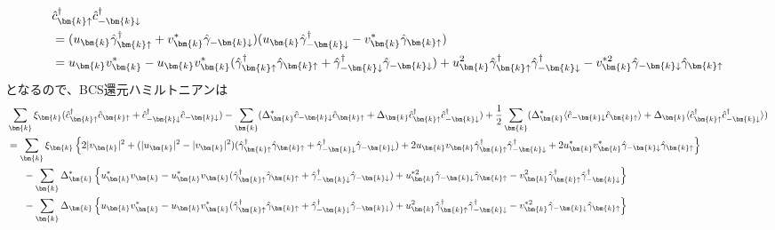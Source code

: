 \documentclass[dvipdfmx, 11pt, a4paper]{jsarticle}
\numberwithin{equation}{section}
\theoremstyle{definition}
\begin{document}
\begin{derivationBox}
\begin{align}
            &\hat{c}_{\bm{k}\uparrow}^\dagger \hat{c}_{-\bm{k}\downarrow}^\dagger \notag \\
            &= (u_{\bm{k}} \hat{\gamma}_{\bm{k}\uparrow}^\dagger + v_{\bm{k}}^* \hat{\gamma}_{-\bm{k}\downarrow})(u_{\bm{k}}\hat{\gamma}_{-\bm{k}\downarrow}^\dagger - v_{\bm{k}}^* \hat{\gamma}_{\bm{k}\uparrow}) \notag \\
            &= u_{\bm{k}}v_{\bm{k}}^* - u_{\bm{k}}v_{\bm{k}}^*(\hat{\gamma}_{\bm{k}\uparrow}^\dagger\hat{\gamma}_{\bm{k}\uparrow} + \hat{\gamma}_{-\bm{k}\downarrow}^\dagger \hat{\gamma}_{-\bm{k}\downarrow} ) + u_{\bm{k}}^2\hat{\gamma}_{\bm{k}\uparrow}^\dagger \hat{\gamma}_{-\bm{k}\downarrow}^\dagger - v_{\bm{k}}^{*2} \hat{\gamma}_{-\bm{k}\downarrow}\hat{\gamma}_{\bm{k}\uparrow}
        \end{align}
        となるので、BCS還元ハミルトニアンは
        \begin{align}
            &\sum_{\bm{k}} \xi_{\bm{k}} (\hat{c}_{\bm{k}\uparrow}^\dagger \hat{c}_{\bm{k}\uparrow} + \hat{c}_{-\bm{k}\downarrow}^\dagger \hat{c}_{-\bm{k}\downarrow}) - \sum_{\bm{k}} (\Delta_{\bm{k}}^* \hat{c}_{-\bm{k}\downarrow}\hat{c}_{\bm{k}\uparrow} + \Delta_{\bm{k}}\hat{c}_{\bm{k}\uparrow}^\dagger \hat{c}_{-\bm{k}\downarrow}^\dagger) + \frac{1}{2}\sum_{\bm{k}}(\Delta_{\bm{k}}^* \langle \hat{c}_{-\bm{k}\downarrow}\hat{c}_{\bm{k}\uparrow}  \rangle + \Delta_{\bm{k}} \langle \hat{c}_{\bm{k}\uparrow}^\dagger \hat{c}_{-\bm{k}\downarrow}^\dagger \rangle ) \notag \\
            &= \sum_{\bm{k}}\xi_{\bm{k}} \left\{ 2|v_{\bm{k}}|^2 + (|u_{\bm{k}}|^2 - |v_{\bm{k}}|^2)(\hat{\gamma}_{\bm{k}\uparrow}^\dagger \hat{\gamma}_{\bm{k}\uparrow} + \hat{\gamma}_{-\bm{k}\downarrow}^\dagger\hat{\gamma}_{-\bm{k}\downarrow}) +2u_{\bm{k}}v_{\bm{k}} \hat{\gamma}_{\bm{k}\uparrow}^\dagger  \hat{\gamma}_{-\bm{k}\downarrow}^\dagger + 2u_{\bm{k}}^* v_{\bm{k}}^* \hat{\gamma}_{-\bm{k}\downarrow}\hat{\gamma}_{\bm{k}\uparrow} \right\} \notag \\
            &\ \ \ \ \ -\sum_{\bm{k}} \Delta_{\bm{k}}^* \left\{ u_{\bm{k}}^* v_{\bm{k}} - u_{\bm{k}}^* v_{\bm{k}} (\hat{\gamma}_{\bm{k}\uparrow}^\dagger  \hat{\gamma}_{\bm{k}\uparrow} + \hat{\gamma}_{-\bm{k}\downarrow}^\dagger \hat{\gamma}_{-\bm{k}\downarrow}) + u_{\bm{k}}^{*2} \hat{\gamma}_{-\bm{k}\downarrow}    \hat{\gamma}_{\bm{k}\uparrow} - v_{\bm{k}}^2 \hat{\gamma}_{\bm{k}\uparrow}^\dagger  \hat{\gamma}_{-\bm{k}\downarrow}^\dagger \right\} \notag \\
            &\ \ \ \ \ -\sum_{\bm{k}} \Delta_{\bm{k}} \left\{ u_{\bm{k}}v_{\bm{k}}^* - u_{\bm{k}}v_{\bm{k}}^*(\hat{\gamma}_{\bm{k}\uparrow}^\dagger\hat{\gamma}_{\bm{k}\uparrow} + \hat{\gamma}_{-\bm{k}\downarrow}^\dagger \hat{\gamma}_{-\bm{k}\downarrow} ) + u_{\bm{k}}^2\hat{\gamma}_{\bm{k}\uparrow}^\dagger \hat{\gamma}_{-\bm{k}\downarrow}^\dagger - v_{\bm{k}}^{*2} \hat{\gamma}_{-\bm{k}\downarrow}\hat{\gamma}_{\bm{k}\uparrow} \right\} \notag \\

\end{align}
\end{derivationBox}
\end{document}
